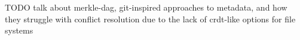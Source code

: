 \documentclass[11pt,fleqn,openany]{book}
\newcommand{\todo}[1]{{\color{red} TODO #1 }}
\begin{document}

\todo{talk about merkle-dag, git-inspired approaches to metadata, and how
they struggle with conflict resolution due to the lack of crdt-like options for
file systems}

\newpage

\begingroup
\raggedright

\endgroup
\end{document}
